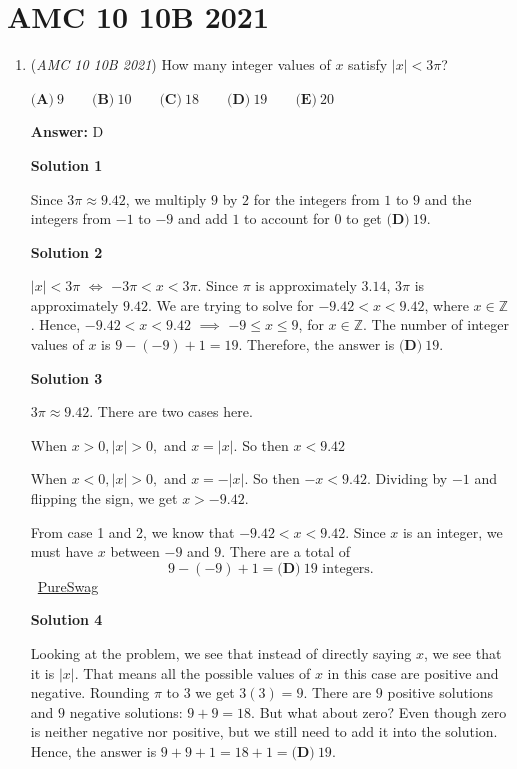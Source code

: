 \section{AMC 10 10B 2021}
        \begin{enumerate}
        	\item (\textit{AMC 10 10B 2021}) How many integer values of $x$ satisfy $|x| < 3\pi$?


 $\textbf{(A)} ~9 \qquad\textbf{(B)} ~10 \qquad\textbf{(C)} ~18 \qquad\textbf{(D)} ~19 \qquad\textbf{(E)} ~20$

 \textbf{Answer: }D



\textbf{Solution 1}

Since $3\pi\approx9.42$, we multiply $9$ by $2$ for the integers from $1$ to $9$ and the integers from $-1$ to $-9$ and add $1$ to account for $0$ to get $\boxed{\textbf{(D)} ~19}$.

 



\textbf{Solution 2}

$|x|<3\pi$ $\iff$ $-3\pi<x<3\pi$. Since $\pi$ is approximately $3.14$, $3\pi$ is approximately $9.42$. We are trying to solve for $-9.42<x<9.42$, where $x\in\mathbb{Z}$. Hence, $-9.42<x<9.42$ $\implies$ $-9\leq x\leq9$, for $x\in\mathbb{Z}$. The number of integer values of $x$ is $9-(-9)+1=19$. Therefore, the answer is $\boxed{\textbf{(D)} ~19}$.

 



\textbf{Solution 3}

$3\pi \approx 9.42.$ There are two cases here.

 When $x>0, |x|>0,$ and $x = |x|.$ So then $x<9.42$

 When $x<0, |x|>0,$ and $x = -|x|.$ So then $-x<9.42$. Dividing by $-1$ and flipping the sign, we get $x>-9.42.$

 From case 1 and 2, we know that $-9.42 < x < 9.42$. Since $x$ is an integer, we must have $x$ between $-9$ and $9$. There are a total of 
 \[9-(-9) + 1 = \boxed{\textbf{(D)} ~19} \text{ integers}.\]~\href{https://artofproblemsolving.com/wiki/index.php?title=User:PureSwag}{PureSwag}

 



\textbf{Solution 4}

Looking at the problem, we see that instead of directly saying $x$, we see that it is $|x|.$ That means all the possible values of $x$ in this case are positive and negative. Rounding $\pi$ to $3$ we get $3(3)=9.$ There are $9$ positive solutions and $9$ negative solutions: $9+9=18.$ But what about zero? Even though zero is neither negative nor positive, but we still need to add it into the solution. Hence, the answer is $9+9+1=18+1=\boxed{\textbf{(D)} ~19}.$





\end{enumerate}
